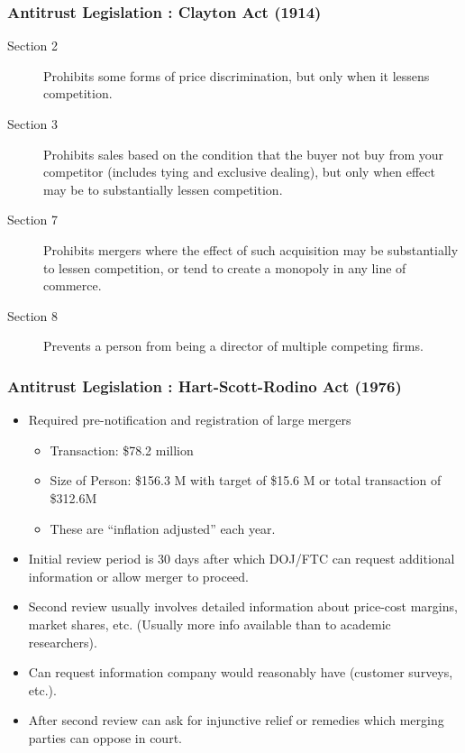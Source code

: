\documentclass[xcolor=pdftex,dvipsnames,table,mathserif]{beamer}
\begin{document}
\begin{frame}
\frametitle{Antitrust Legislation : Clayton Act (1914)}
 \begin{description}
\item [Section 2] Prohibits some forms of price discrimination, but only when it lessens competition.
\item [Section 3] Prohibits sales based on the condition that the buyer not buy from your competitor (includes tying and exclusive dealing), but only when effect may be to substantially lessen competition.
\item [Section 7] Prohibits mergers where the effect of such acquisition may be substantially to lessen competition, or tend to create a monopoly in any line of commerce.
\item [Section 8] Prevents a person from being a director of multiple competing firms.
 \end{description}
\end{frame}

\begin{frame}
\frametitle{Antitrust Legislation : Hart-Scott-Rodino Act (1976)}
 \begin{itemize}
\item Required pre-notification and registration of large mergers
\begin{itemize}
\item Transaction: \$78.2 million
\item Size of Person: \$156.3 M with target of \$15.6 M or total transaction of \$312.6M
\item These are ``inflation adjusted'' each year.
\end{itemize}
\item Initial review period is 30 days after which DOJ/FTC can request additional information or allow merger to proceed.
\item Second review usually involves detailed information about  price-cost margins, market shares, etc. (Usually more info available than to academic researchers).
\item Can request information company would reasonably have (customer surveys, etc.).
\item After second review can ask for \alert{injunctive relief} or \alert{remedies} which merging parties can oppose in court.
 \end{itemize}
\end{frame}
\end{document}
